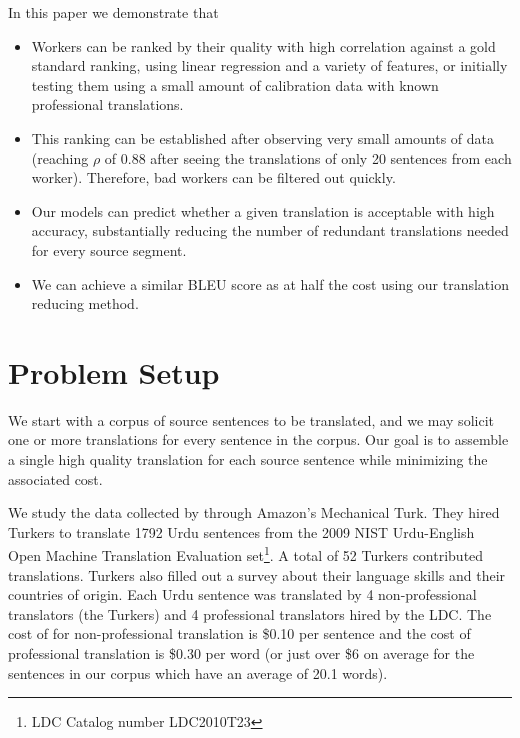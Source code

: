 \documentclass[11pt,letterpaper]{article}
\begin{document}
 In this paper we demonstrate that
 \begin{itemize}
 \item Workers can be ranked by their quality with high correlation against a gold standard ranking, using linear regression and a variety of features, or initially testing them using a small amount of calibration data with known professional translations.
 \item This ranking can be established after observing very small amounts of data (reaching $\rho$ of 0.88 after seeing the translations of only 20 sentences from each worker). Therefore, bad workers can be filtered out quickly.
 \item Our models can predict whether a given translation is acceptable with high accuracy, substantially reducing the number of redundant translations needed for every source segment.
 \item We can achieve a similar BLEU score as  at half the cost using our translation reducing method.
 \end{itemize} 
 
\section{Problem Setup}

We start with a corpus of source sentences to be translated, and we may solicit one or more translations for every sentence in the corpus.  Our goal is to assemble a single high quality translation for each source sentence while minimizing the associated cost. 

We study the data collected by  through Amazon's Mechanical Turk. 
They hired Turkers to translate 1792 Urdu sentences 
from the  2009 NIST Urdu-English Open Machine Translation Evaluation set\footnote{LDC Catalog number LDC2010T23}. A total of 52 Turkers contributed translations. Turkers also filled out a survey about their language skills and their countries of origin. Each Urdu sentence was translated by 4 non-professional translators (the Turkers) and 4 professional translators hired by the LDC. The cost of for non-professional translation is  \$0.10 per sentence and the cost of professional translation is \$0.30 per word (or just over \$6 on average for the sentences in our corpus which have an average of 20.1 words). 
\end{document}
